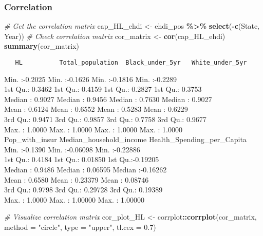 \documentclass[
]{article}
\newenvironment{Shaded}{\begin{snugshade}}{\end{snugshade}}
\newcommand{\AttributeTok}[1]{\textcolor[rgb]{0.13,0.29,0.53}{#1}}
\newcommand{\CommentTok}[1]{\textcolor[rgb]{0.56,0.35,0.01}{\textit{#1}}}
\newcommand{\FloatTok}[1]{\textcolor[rgb]{0.00,0.00,0.81}{#1}}
\newcommand{\FunctionTok}[1]{\textcolor[rgb]{0.13,0.29,0.53}{\textbf{#1}}}
\newcommand{\NormalTok}[1]{#1}
\newcommand{\OtherTok}[1]{\textcolor[rgb]{0.56,0.35,0.01}{#1}}
\newcommand{\SpecialCharTok}[1]{\textcolor[rgb]{0.81,0.36,0.00}{\textbf{#1}}}
\newcommand{\StringTok}[1]{\textcolor[rgb]{0.31,0.60,0.02}{#1}}
\begin{document}
\hypertarget{correlation}{%
\subsubsection{Correlation}\label{correlation}}

\begin{Shaded}
\begin{Highlighting}[]
\CommentTok{\# Get the correlation matrix}
\NormalTok{cap\_HL\_ehdi }\OtherTok{\textless{}{-}}\NormalTok{ ehdi\_pos }\SpecialCharTok{\%\textgreater{}\%} 
  \FunctionTok{select}\NormalTok{(}\SpecialCharTok{{-}}\FunctionTok{c}\NormalTok{(State, Year))}
\CommentTok{\# Check correlation matrix}
\NormalTok{cor\_matrix }\OtherTok{\textless{}{-}} \FunctionTok{cor}\NormalTok{(cap\_HL\_ehdi)}
\FunctionTok{summary}\NormalTok{(cor\_matrix)}
\end{Highlighting}
\end{Shaded}

\begin{verbatim}
   HL          Total_population  Black_under_5yr   White_under_5yr  
\end{verbatim}

Min. :-0.2025 Min. :-0.1626 Min. :-0.1816 Min. :-0.2289\\
1st Qu.: 0.3462 1st Qu.: 0.4159 1st Qu.: 0.2827 1st Qu.: 0.3753\\
Median : 0.9027 Median : 0.9456 Median : 0.7630 Median : 0.9027\\
Mean : 0.6124 Mean : 0.6552 Mean : 0.5283 Mean : 0.6229\\
3rd Qu.: 0.9471 3rd Qu.: 0.9857 3rd Qu.: 0.7758 3rd Qu.: 0.9677\\
Max. : 1.0000 Max. : 1.0000 Max. : 1.0000 Max. : 1.0000\\
Pop\_with\_insur Median\_household\_income Health\_Spending\_per\_Capita
Min. :-0.1390 Min. :-0.06098 Min. :-0.22886\\
1st Qu.: 0.4184 1st Qu.: 0.01850 1st Qu.:-0.19205\\
Median : 0.9486 Median : 0.06595 Median :-0.16262\\
Mean : 0.6580 Mean : 0.23379 Mean : 0.08746\\
3rd Qu.: 0.9798 3rd Qu.: 0.29728 3rd Qu.: 0.19389\\
Max. : 1.0000 Max. : 1.00000 Max. : 1.00000

\begin{Shaded}
\begin{Highlighting}[]
\CommentTok{\# Visualize correlation matrix}
\NormalTok{cor\_plot\_HL }\OtherTok{\textless{}{-}}\NormalTok{ corrplot}\SpecialCharTok{::}\FunctionTok{corrplot}\NormalTok{(cor\_matrix, }\AttributeTok{method =} \StringTok{"circle"}\NormalTok{, }\AttributeTok{type =} \StringTok{"upper"}\NormalTok{, }\AttributeTok{tl.cex =} \FloatTok{0.7}\NormalTok{)}
\end{Highlighting}
\end{Shaded}
\end{document}
